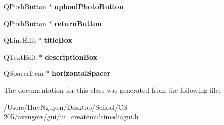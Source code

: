 \begin{DoxyCompactItemize}
\item 
Q\+Push\+Button $\ast$ {\bfseries upload\+Photo\+Button}\hypertarget{classUi__CreateMultimediaGUI_aa06d644de6dd4c849d6ed061adb32e95}{}\label{classUi__CreateMultimediaGUI_aa06d644de6dd4c849d6ed061adb32e95}

\item 
Q\+Push\+Button $\ast$ {\bfseries return\+Button}\hypertarget{classUi__CreateMultimediaGUI_aba1ebe6398a52577acbd50f99309488a}{}\label{classUi__CreateMultimediaGUI_aba1ebe6398a52577acbd50f99309488a}

\item 
Q\+Line\+Edit $\ast$ {\bfseries title\+Box}\hypertarget{classUi__CreateMultimediaGUI_aa4c0fcc3ff19f3f54676257f132753b4}{}\label{classUi__CreateMultimediaGUI_aa4c0fcc3ff19f3f54676257f132753b4}

\item 
Q\+Text\+Edit $\ast$ {\bfseries description\+Box}\hypertarget{classUi__CreateMultimediaGUI_ab8b5a82c862fbb64ba60be8844650b50}{}\label{classUi__CreateMultimediaGUI_ab8b5a82c862fbb64ba60be8844650b50}

\item 
Q\+Spacer\+Item $\ast$ {\bfseries horizontal\+Spacer}\hypertarget{classUi__CreateMultimediaGUI_ab0620de0b5a1510e606ddb7e8f05b553}{}\label{classUi__CreateMultimediaGUI_ab0620de0b5a1510e606ddb7e8f05b553}

\end{DoxyCompactItemize}


The documentation for this class was generated from the following file\+:\begin{DoxyCompactItemize}
\item 
/\+Users/\+Huy\+Nguyen/\+Desktop/\+School/\+C\+S 205/avengers/gui/ui\+\_\+createmultimediagui.\+h\end{DoxyCompactItemize}
